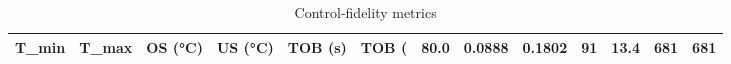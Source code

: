 \begin{table}[htbp]
\centering
\caption{Control-fidelity metrics}
\label{tab:fidelity}
\begin{tabular}{llllllll}
\hline
T_min & T_max & OS (°C) & US (°C) & TOB (s) & TOB (%
 & 80.0 & 0.0888 & 0.1802 & 91 & 13.4 & 681 & 681 \\
\hline
\end{tabular}
\end{table}
